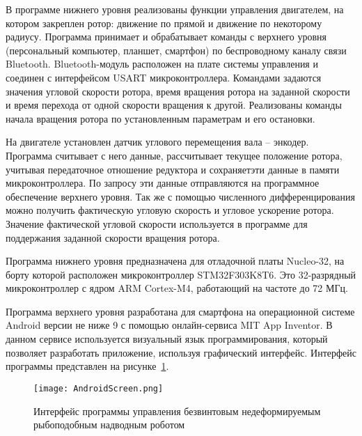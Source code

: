 В программе нижнего уровня реализованы функции управления двигателем, на котором закреплен ротор: движение по прямой и движение по некоторому радиусу. Программа принимает и обрабатывает команды с верхнего уровня (персональный компьютер, планшет, смартфон) по беспроводному каналу связи Bluetooth. Bluetooth-модуль расположен на плате системы управления и соединен с интерфейсом USART микроконтроллера. Командами задаются значения угловой скорости ротора, время вращения ротора на заданной скорости и время перехода от одной скорости вращения к другой. Реализованы команды начала вращения ротора по установленным параметрам и его остановки.

На двигателе установлен датчик углового перемещения вала – энкодер. Программа считывает с него данные, рассчитывает текущее положение ротора, учитывая передаточное отношение редуктора и сохраняетэти данные в памяти микроконтроллера. По запросу эти данные отправляются на программное обеспечение верхнего уровня. Так же с помощью численного дифференцирования можно получить фактическую угловую скорость и угловое ускорение ротора. Значение фактической угловой скорости используется в программе для поддержания заданной скорости вращения ротора.

Программа нижнего уровня предназначена для отладочной платы Nucleo-32, на борту которой расположен микроконтроллер STM32F303K8T6. Это 32-разрядный микроконтроллер с ядром ARM Cortex-M4, работающий на частоте до 72 МГц.

Программа верхнего уровня разработана для смартфона на операционной системе Android версии не ниже 9 с помощью онлайн-сервиса MIT App Inventor. В данном сервисе используется визуальный язык программирования, который позволяет разработать приложение, используя графический интерфейс. Интерфейс программы представлен на рисунке~\ref{AndroidScreen}.



\begin{figure}[!h]
	\centering
	\texttt{[image: AndroidScreen.png]}
	\caption{Интерфейс программы управления безвинтовым недеформируемым рыбоподобным надводным роботом}
	\label{AndroidScreen}
\end{figure}

